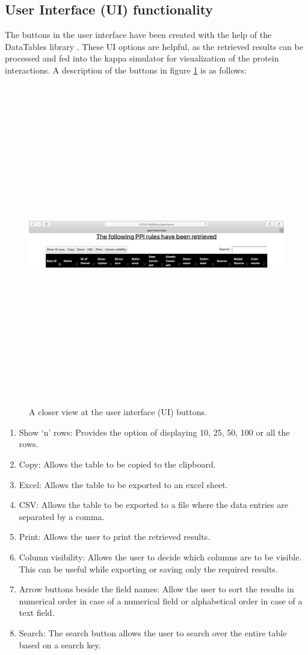 \documentclass[msc,deptreport,ai]{infthesis}      %
\begin{document}
\subsection {User Interface (UI) functionality}
The buttons in the user interface have been created with the help of the DataTables library \cite{dataTables}. These UI options are helpful, as the retrieved results can be processed and fed into the  kappa simulator for visualization of the protein interactions. A description of the buttons in figure \ref{fig:UI} is as follows:
\begin{figure}[H]
	\centering
	\captionsetup{justification=centering}
	\includegraphics[width=\linewidth,height=14cm,keepaspectratio]{UI.png}	
	\caption{A closer view at the user interface (UI) buttons.}
	\label{fig:UI}		
\end{figure}
\begin{enumerate}
	\item Show `n' rows: Provides the option of displaying 10, 25, 50, 100 or all the rows.
	\item Copy: Allows the table to be copied to the clipboard.
	\item Excel: Allows the table to be exported to an excel sheet.
	\item CSV: Allows the table to be exported to a file where the data entries are separated by a comma.
	\item Print: Allows the user to print the retrieved results.
	\item Column visibility: Allows the user to decide which columns are to be visible. This can be useful while exporting or saving only the required results.
	\item Arrow buttons beside the field names: Allow the user to sort the results in numerical order in case of a numerical field or alphabetical order in case of a text field.
	\item Search: The search button allows the user to search over the entire table based on a search key.
\end{enumerate}
\end{document}
